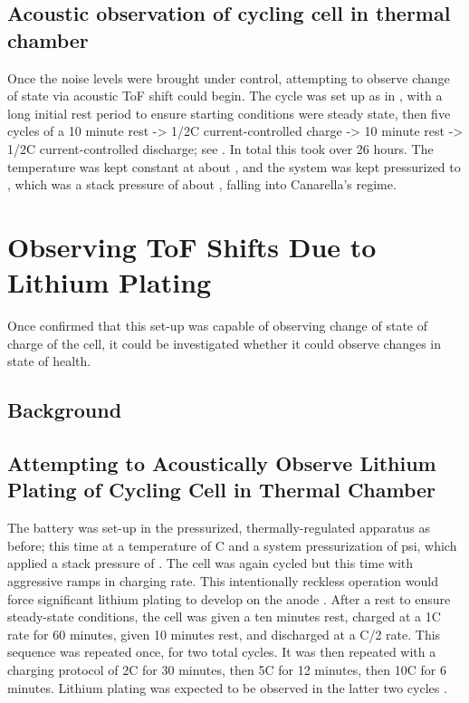     
\subsection{Acoustic observation of cycling cell in thermal chamber}
Once the noise levels were brought under control, attempting to observe change of state via acoustic ToF shift could begin. The cycle was set up as in , with a long initial rest period to ensure starting conditions were steady state, then five cycles of a 10 minute rest -> 1/2C current-controlled charge -> 10 minute rest -> 1/2C current-controlled discharge; see . In total this took over 26 hours. The temperature was kept constant at about , and the system was kept pressurized to , which was a stack pressure of about , falling into Canarella's  regime.

\section{Observing ToF Shifts Due to Lithium Plating} 
Once confirmed that this set-up was capable of observing change of state of charge of the cell, it could be investigated whether it could observe changes in state of health.

\subsection{Background}

\subsection{Attempting to Acoustically Observe Lithium Plating of Cycling Cell in Thermal Chamber}
The battery was set-up in the pressurized, thermally-regulated apparatus as before; this time at a temperature of  C and a system pressurization of  psi, which applied a stack pressure of . 
The cell was again cycled but this time with aggressive ramps in charging rate. 
This intentionally reckless operation would force significant lithium plating to develop on the anode . 
After a rest to ensure steady-state conditions, the cell was given a ten minutes rest, charged at a 1C rate for 60 minutes, given 10 minutes rest, and discharged at a C/2 rate. 
This sequence was repeated once, for two total cycles. 
It was then repeated with a charging protocol of 2C for 30 minutes, then 5C for 12 minutes, then 10C for 6 minutes. 
Lithium plating was expected to be observed in the latter two cycles .
    
